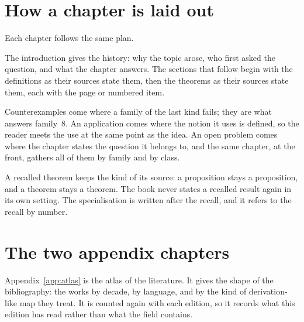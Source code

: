 \section*{How a chapter is laid out}

Each chapter follows the same plan. %

The introduction gives the history: why the topic arose, who first asked the %
question, and what the chapter answers. %
The sections that follow begin with the definitions as their sources state them, %
then the theorems as their sources state them, each with the page or numbered %
item. %

Counterexamples come where a family of the last kind fails; they are what %
answers family~8. %
An application comes where the notion it uses is defined, so the reader meets %
the use at the same point as the idea. %
An open problem comes where the chapter states the question it belongs to, %
and the same chapter, at the front, gathers all of them by family and by class. %

A recalled theorem keeps the kind of its source: a proposition stays a %
proposition, and a theorem stays a theorem. %
The book never states a recalled result again in its own setting. %
The specialisation is written after the recall, and it refers to the recall by %
number. %

\section*{The two appendix chapters}

Appendix~\ref{app:atlas} is the atlas of the literature. %
It gives the shape of the bibliography: the works by decade, by language, and by %
the kind of derivation-like map they treat. %
It is counted again with each edition, so it records what this edition has read %
rather than what the field contains. %

